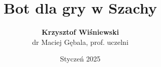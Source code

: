 \documentclass{beamer}
\title[Bot do gry w Szachy]{Bot dla gry w Szachy}
\author[K. Wiśniewski]{\textbf {Krzysztof Wiśniewski} \\ dr Maciej Gębala, prof. uczelni}
\institute[]{
  Politechnika Wrocławska\\
  Wydział Informatyki i Telekomunikacji\\
  Informatyka Algorytmiczna \\
}
\date{Styczeń 2025}
\begin{document}
\begin{frame}
  \titlepage
\end{frame}

%  
  
  
  
  
\end{document}
